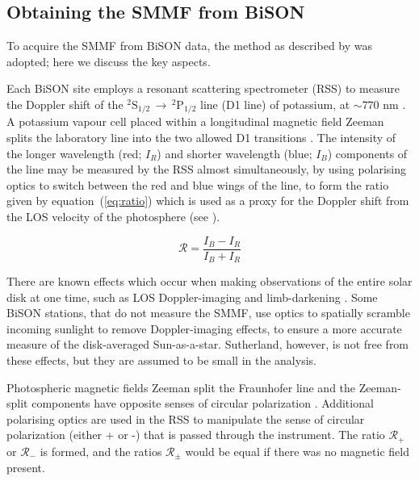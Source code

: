 \subsection{Obtaining the SMMF from BiSON}

To acquire the SMMF from BiSON data, the method as described by \citet{chaplin_studies_2003} was adopted; here we discuss the key aspects.

Each  BiSON site employs a resonant scattering spectrometer (RSS) to measure the Doppler shift of the $^{2}\mathrm{S}_{1/2} \, \rightarrow \, ^{2}\mathrm{P}_{1/2}$ line (D1 line) of potassium, at $\sim 770$ nm \citep{brookes_resonant-scattering_1978}. A potassium vapour cell placed within a longitudinal magnetic field Zeeman splits the laboratory line into the two allowed D1 transitions \citep{lund_spatial_2017}. The intensity of the longer wavelength (red; $I_R$) and shorter wavelength (blue; $I_B$) components of the line may be measured by the RSS almost simultaneously, by using polarising optics to switch between the red and blue wings of the line, to form the ratio given by equation~(\ref{eq:ratio}) which is used as a proxy for the Doppler shift from the LOS velocity of the photosphere (see \citet{brookes_observation_1976, brookes_resonant-scattering_1978, elsworth_performance_1995, chaplin_studies_2003, lund_spatial_2017}).  

\begin{equation}
\mathcal{R} = \frac{I_B - I_R}{I_B + I_R}
\label{eq:ratio}
\end{equation}

There are known effects which occur when making observations of the entire solar disk at one time, such as LOS Doppler-imaging and limb-darkening \citep{davies_bison_2014}. Some BiSON stations, that do not measure the SMMF, use optics to spatially scramble incoming sunlight to remove Doppler-imaging effects, to ensure a more accurate measure of the disk-averaged Sun-as-a-star. Sutherland, however, is not free from these effects, but they are assumed to be small in the analysis.

Photospheric magnetic fields Zeeman split the Fraunhofer line and the Zeeman-split components have opposite senses of circular polarization \citep{chaplin_studies_2003}. Additional polarising optics are used in the RSS to manipulate the sense of circular polarization (either + or -) that is passed through the instrument. The ratio $\mathcal{R}_{+}$ or $\mathcal{R}_{-}$ is formed, and the ratios $\mathcal{R}_{\pm}$ would be equal if there was no magnetic field present.

